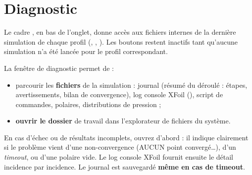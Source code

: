 \section{Diagnostic}
\label{sec:diagnostic}

Le cadre , en bas de l'onglet, donne accès aux
fichiers internes de la dernière simulation de chaque profil
(, , ). Les
boutons restent inactifs tant qu'aucune simulation n'a été lancée
pour le profil correspondant.


La fenêtre de diagnostic permet de :

\begin{itemize}
    \item parcourir les \textbf{fichiers} de la simulation : journal
         (résumé du déroulé : étapes,
        avertissements, bilan de convergence), log console XFoil
        (), script de commandes,
        polaires, distributions de pression ;
    \item \textbf{ouvrir le dossier} de travail dans l'explorateur
        de fichiers du système.
\end{itemize}

\begin{astuce}
En cas d'échec ou de résultats incomplets, ouvrez d'abord
 : il indique clairement si le problème
vient d'une non-convergence (\og AUCUN point convergé\dots\fg{}),
d'un \emph{timeout}, ou d'une polaire vide. Le log console XFoil
fournit ensuite le détail incidence par incidence. Le journal est
sauvegardé \textbf{même en cas de timeout}.
\end{astuce}
